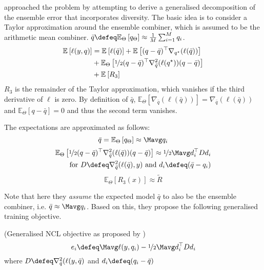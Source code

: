 \documentclass[../main.tex]{subfiles}
\begin{document}
\citeauthor{buschjager_GeneralizedNegativeCorrelation_2020} \cite{buschjager_GeneralizedNegativeCorrelation_2020} approached the problem by attempting to derive a generalised decomposition of the ensemble error that incorporates diversity. The basic idea is to consider a Taylor approximation around the ensemble combiner, which is assumed to be the arithmetic mean combiner. $\bar{q} \defeq \mathbb{E}_{\Theta}\left[ q_{\Theta} \right] \approx \frac{1}{M}\sum_{i=1}^M q_i$.
\begin{align*}
\mathbb{E}_{}\left[ \ell(y, q) \right]  &= 
\mathbb{E}_{}\left[ \ell(\bar{q}) \right] 
+ \mathbb{E}_{}\left[ (q - \bar{q})^\top \nabla_{q^\star}(\ell (\bar{q})) \right]  \\
&+ \mathbb{E}_{\Theta}\left[ \nicefrac{1}{2} (q-\bar{q})^\top\nabla^2_{\bar{q}}(\ell(q^\star))(q-\bar{q}) \right] \\
&+ \mathbb{E}_{}\left[ R_{3} \right] 
\end{align*}
$R_{3}$ is the remainder of the Taylor approximation, which vanishes if the third derivative of $\ell$ is zero.
By definition of $\bar{q}$, $\mathbb{E}_{\Theta}\left[ \nabla_{\bar{q}}(\ell(\bar{q})) \right] = \nabla_{\bar{q}}(\ell(\bar{q}))$ and $\mathbb{E}_{\Theta}\left[ q-\bar{q} \right] = 0$ and thus the second term vanishes.

The expectations are approximated as follows:
$$
\bar{q} = \mathbb{E}_{{\Theta}}\left[ q_{\Theta} \right] \approx \Mavg q_{i}
$$
\begin{align*}
\mathbb{E}_{\Theta}\left[ \nicefrac{1}{2} (q-\bar{q})^\top\nabla^2_{\bar{q}}(\ell(\bar{q}))(q-\bar{q}) \right] \approx \nicefrac{1}{2}\Mavg d_{i}^\top D d_{i} \\
\text{~~for $D \defeq \nabla^2_{\bar{q}}(\ell(\bar{q}),y)$ and $d_{i} \defeq (\bar{q} - q_i)$}
\end{align*}
\vspace{0.5em}
$$
\mathbb{E}_{\Theta}\left[ R_{3}(x) \right]  \approx \tilde{R}
$$


Note that here they \textit{assume} the expected model $\bar{q}$ to also be the ensemble combiner, i.e. $\bar{q} \approx \Mavg q_{i}$. 
Based on this, they propose the following generalised training objective.
\begin{definition} (Generalised NCL objective as proposed by \cite{buschjager_GeneralizedNegativeCorrelation_2020})
    \label{def:buschj-ncl-objective}
$$
e_i \defeq \Mavg \ell(y,q_{i}) - \nicefrac{1}{2} \Mavg d_{i}^\top D d_{i}
$$
where $D \defeq \nabla^2_{\bar{q}}(\ell(y, \bar{q})$ and $d_{i} \defeq (q_{i} - \bar{q})$
\end{definition}
\end{document}
